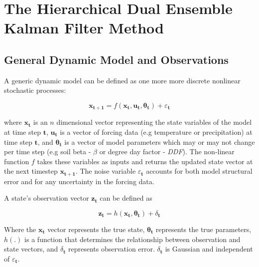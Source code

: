 \chapter{The Hierarchical Dual Ensemble Kalman Filter Method}


\section{General Dynamic Model and Observations}


A generic dynamic model can be defined as one more more discrete nonlinear stochastic processes\cite{Chen2008}:

\begin{equation}\label{eq:gen_stoc}
\mathbf{x_{t+1}} = f(\mathbf{x_{t}}, \mathbf{u_{t}}, \bm{\theta_{t}}) + \varepsilon_{\mathbf{t}}
\end{equation}

where $\mathbf{x_{t}}$ is an $n$ dimensional vector representing the state variables of the model at time step $\mathbf{t}$, $\mathbf{u_{t}}$ is a vector of forcing data (e.g temperature or precipitation) at time step $\mathbf{t}$, and $\bm{\theta_{t}}$ is a vector of model parameters which may or may not change per time step (e.g soil beta - $\beta$ or degree day factor -  \textit{DDF}). The non-linear function $f$ takes these variables as inputs and returns the updated state vector at the next timestep $\mathbf{x_{t+1}}$. The noise variable $\varepsilon_{\mathbf{t}}$ accounts for both model structural error and for any uncertainty in the forcing data.

A state's observation vector $\mathbf{z_{t}}$ can be defined as

\begin{equation}\label{eq:gen_obs}
\mathbf{z_{t}} = h(\mathbf{x_{t}}, \bm{\theta_{t}}) + \delta_{\mathbf{t}}
\end{equation}

Where the $\mathbf{x_{t}}$ vector represents the true state, $\mathbf{\theta_{t}}$ represents the true parameters, $h(.)$ is a function that determines the relationship between observation and state vectors, and $\delta_{\mathbf{t}}$ represents observation error. $\delta_{\mathbf{t}}$ is Gaussian and independent of $\varepsilon_{\mathbf{t}}$.

